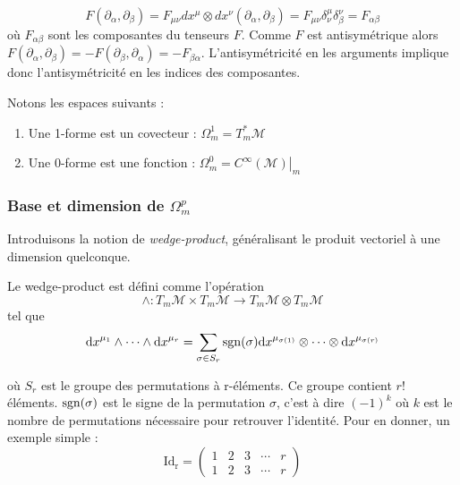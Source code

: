 \begin{equation}
    F(\partial_{\alpha}, \partial_{\beta}) = F_{\mu \nu} dx^{\mu}\otimes dx^{\nu}(\partial_{\alpha}, \partial_{\beta}) = F_{\mu \nu} \delta^{\mu}_{\nu}\delta^{\nu}_{\beta } = F_{\alpha \beta}
\end{equation}
où $F_{\alpha \beta}$ sont les composantes du tenseurs $F$. Comme $F$ est antisymétrique alors $F(\partial_{\alpha}, \partial_{\beta}) = -F(\partial_{\beta}, \partial_{\alpha}) = -F_{ \beta \alpha}$. L'antisymétricité en les arguments implique donc l'antisymétricité en les indices des composantes.
\begin{rmk}
    Notons les espaces suivants :
    \begin{enumerate}
        \item Une 1-forme est un covecteur : $\Omega_m^1 = T_m^*\mathcal{M}$
        \item Une 0-forme est une fonction : $\Omega_m^0 = \left. C^\infty(\mathcal{M}) \right|_m$
    \end{enumerate}
\end{rmk}

\subsubsection{Base et dimension de $\Omega_m^p$}

  Introduisons la notion de \emph{wedge-product}, généralisant le produit vectoriel à une dimension quelconque.
\begin{theoremframe}
    \begin{defi}
        Le wedge-product est défini comme l'opération 
        \begin{equation}
        \wedge : T_m\mathcal{M} \times T_m\mathcal{M} \to T_m \mathcal{M} \otimes T_m\mathcal{M}
        \end{equation}
        tel que
        \begin{equation}
            \mathrm{d} x^{\mu_1}\wedge \cdots\wedge \mathrm{d} x^{\mu_r} = \sum_{\sigma \in S_r} \operatorname{sgn}(\sigma) \mathrm{d} x^{\mu_{\sigma(1)}} \otimes \cdots \otimes \mathrm{d} x^{\mu_{\sigma(r)}}
        \end{equation}
    \end{defi}
\end{theoremframe}
où $S_r$ est le groupe des permutations à r-éléments. Ce groupe contient $r!$ éléments. $\operatorname{sgn}(\sigma)$ est le signe de la permutation $\sigma$, c'est à dire $(-1)^k$ où $k$ est le nombre de permutations nécessaire pour retrouver l'identité. Pour en donner, un exemple simple :
\begin{equation*}
    \mathrm{Id_r} = 
    \begin{pmatrix}
        1 & 2 & 3 & \cdots & r \\
        1 & 2 & 3 & \cdots & r 
    \end{pmatrix}
\end{equation*}

